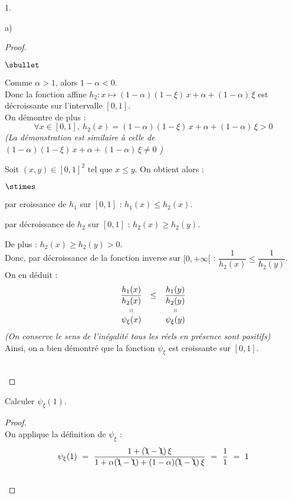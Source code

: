 \begin{noliste}{1.}
\begin{noliste}{a)}
\begin{proof}
\begin{remark}
\begin{noliste}{$\sbullet$}
	  \item Comme $\alpha >1$, alors $1-\alpha <0$.\\
	  Donc la fonction affine $h_2 : x \mapsto (1-\alpha)(1-\xi)
	  \, x + \alpha + (1-\alpha) \, \xi$ est décroissante sur 
	  l'intervalle $[0,1]$.\\
	  On démontre de plus : 
	  \[
	    \forall x \in [0,1], \ h_2(x) =
	    (1-\alpha)(1-\xi) \, x + \alpha + (1-\alpha) \, \xi
	    >0
	  \]
	  {\it (La démonstration est similaire à celle de \og 
	  $(1-\alpha)(1-\xi) \, x + \alpha + (1-\alpha) \, \xi \neq 
	  0$ \fg{})}
	  
	  \item Soit $(x,y) \in [0,1]^2$ tel que $x \leq y$. On obtient
	  alors :
	  \begin{noliste}{$\stimes$}
	    \item par croissance de $h_1$ sur $[0,1]$ :
	    $h_1(x) \leq h_2(x)$.
	    
	    \item par décroissance de $h_2$ sur $[0,1]$ : 
	    $h_2(x) \geq h_2(y)$.
	  \end{noliste}
	  De plus : $h_2(x) \geq h_2(y) >0$.\\
	  Donc, par décroissance de la fonction inverse sur 
	  $[0,+\infty[$ : $\dfrac{1}{h_2(x)} \leq 
	  \dfrac{1}{h_2(y)}$.\\[.1cm]
	  On en déduit :
	  \[
	    \begin{array}{ccc}
	      \dfrac{h_1(x)}{h_2(x)} & \leq & \dfrac{h_1(y)}{h_2(y)}
	      \\
	      \shortparallel & & \shortparallel
	      \\
	      \psi_\xi(x) & & \psi_\xi(y)
	    \end{array}
	  \]
	  {\it (On conserve le sens de l'inégalité tous les réels 
	  en présence sont positifs)}\\
	  Ainsi, on a bien démontré que la fonction $\psi_\xi$ est 
	  croissante sur $[0,1]$.
        \end{noliste}
      \end{remark}~\\[-1.4cm]
    \end{proof}

    
    \item Calculer $\psi_\xi(1)$.
    
    \begin{proof}~\\
      On applique la définition de $\psi_\xi$ :
      \[
        \psi_\xi(1) \ = \ \dfrac{1+(\bcancel{1} - \bcancel{1}) \, \xi}
        {1+ \alpha(\bcancel{1}-\bcancel{1}) + (1-\alpha)
        (\bcancel{1}-\bcancel{1}) \, \xi} \ = \ \dfrac{1}{1} \ = \ 1
      \]
      ~\\[-1cm]
    \end{proof}


\end{noliste}
\end{noliste}
